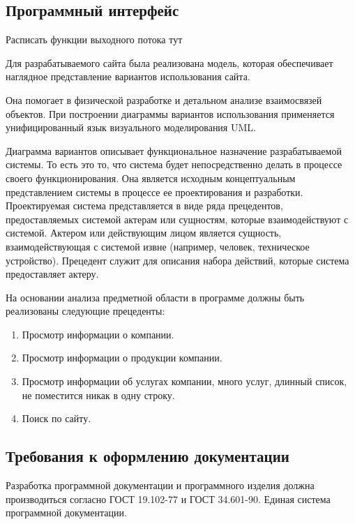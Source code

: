 
\subsection{Программный интерфейс}
Расписать функции выходного потока тут

Для разрабатываемого сайта была реализована модель, которая обеспечивает наглядное представление вариантов использования сайта.

Она помогает в физической разработке и детальном анализе взаимосвязей объектов. При построении диаграммы вариантов использования применяется унифицированный язык визуального моделирования UML.

Диаграмма вариантов описывает функциональное назначение разрабатываемой системы. То есть это то, что система будет непосредственно делать в процессе своего функционирования. Она является исходным концептуальным представлением системы в процессе ее проектирования и разработки. Проектируемая система представляется в виде ряда прецедентов, предоставляемых системой актерам или сущностям, которые взаимодействуют с системой. Актером или действующим лицом является сущность, взаимодействующая с системой извне (например, человек, техническое устройство). Прецедент служит для описания набора действий, которые система предоставляет актеру.

На основании анализа предметной области в программе должны быть реализованы следующие прецеденты:
\begin{enumerate}
\item Просмотр информации о компании.
\item Просмотр информации о продукции компании.
\item Просмотр информации об услугах компании, много услуг, длинный список, не поместится никак в одну строку.
\item Поиск по сайту.
\end{enumerate}

\subsection{Требования к оформлению документации}

Разработка программной документации и программного изделия должна производиться согласно ГОСТ 19.102-77 и ГОСТ 34.601-90. Единая система программной документации.
